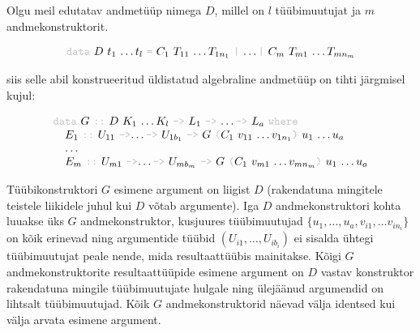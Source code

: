 \documentclass[12pt]{article}
\begin{document}
        Olgu meil edutatav andmetüüp nimega $D$, millel on $l$ tüübimuutujat ja $m$ andmekonstruktorit.

        \begin{equation*}
          \begin{tabular}{l}
            {\color{helehall}\verb!data!} $D$ $t_1$ \ldots $t_l$ {\color{helehall}\verb!=!} $C_1$ $T_{11}$ \ldots $T_{1n_1}$ {\color{helehall}\verb!|!} \ldots {\color{helehall}\verb!|!} $C_m$ $T_{m1}$ \ldots $T_{mn_m}$
          \end{tabular}
        \end{equation*}

        siis selle abil konstrueeritud üldistatud algebraline andmetüüp on tihti järgmisel kujul:

        \begin{equation*}
          \begin{tabular}{l}
            {\color{helehall}\verb!data!} $G$ {\color{helehall}\verb!::!} $D$ $K_1$ \ldots $K_l$ {\color{helehall}\verb!->!} $L_1$ {\color{helehall}\verb!->!} \ldots {\color{helehall}\verb!->!} $L_a$ {\color{helehall}\verb!where!} \\
            \verb!  !$E_1$ {\color{helehall}\verb!::!} $U_{11}$ {\color{helehall}\verb!->!}\ldots {\color{helehall}\verb!->!} $U_{1b_1}$ {\color{helehall}\verb!->!} $G$ {\color{helehall}\verb!(!}$C_1$ $v_{11}$ \ldots $v_{1n_1}${\color{helehall}\verb!)!} $u_1$ \ldots $u_a$ \\
            \verb!  !\ldots \\
            \verb!  !$E_m$ {\color{helehall}\verb!::!} $U_{m1}$ {\color{helehall}\verb!->!}\ldots {\color{helehall}\verb!->!} $U_{mb_m}$ {\color{helehall}\verb!->!} $G$ {\color{helehall}\verb!(!}$C_1$ $v_{m1}$ \ldots $v_{mn_m}${\color{helehall}\verb!)!} $u_1$ \ldots $u_a$
          \end{tabular}
        \end{equation*}

        Tüübikonstruktori $G$ esimene argument on liigist $D$ (rakendatuna mingitele teistele liikidele juhul kui $D$ võtab argumente). Iga $D$ andmekonstruktori kohta luuakse üks $G$ andmekonstruktor, kusjuures tüübimuutujad $\{u_1,\ldots,u_a,v_{i1},\ldots v_{in_i}\}$ on kõik erinevad ning argumentide tüübid $(U_{i1},\ldots,U_{ib_i})$ ei sisalda ühtegi tüübimuutujat peale nende, mida resultaattüübis mainitakse. Kõigi $G$ andmekonstruktorite resultaattüüpide esimene argument on $D$ vastav konstruktor rakendatuna mingile tüübimuutujate hulgale ning ülejäänud argumendid on lihtsalt tüübimuutujad. Kõik $G$ andmekonstruktorid näevad välja identsed kui välja arvata esimene argument.
\end{document}

